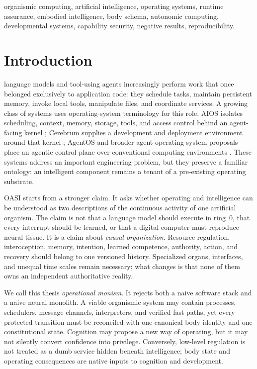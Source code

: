 \documentclass[journal,10pt]{IEEEtran}
\newcommand{\OASI}{\textsc{OASI}}
\begin{document}
\begin{IEEEkeywords}
organismic computing, artificial intelligence, operating systems, runtime assurance, embodied intelligence, body schema, autonomic computing, developmental systems, capability security, negative results, reproducibility.
\end{IEEEkeywords}

\section{Introduction}
 language models and tool-using agents increasingly perform work that once belonged exclusively to application code: they schedule tasks, maintain persistent memory, invoke local tools, manipulate files, and coordinate services. A growing class of systems uses operating-system terminology for this role. AIOS isolates scheduling, context, memory, storage, tools, and access control behind an agent-facing kernel \cite{mei2024aios}; Cerebrum supplies a development and deployment environment around that kernel \cite{rama2025cerebrum}; AgentOS and broader agent operating-system proposals place an agentic control plane over conventional computing environments \cite{liu2026agentos,sharma2026aos}. These systems address an important engineering problem, but they preserve a familiar ontology: an intelligent component remains a tenant of a pre-existing operating substrate.

\OASI{} starts from a stronger claim. It asks whether operating and intelligence can be understood as two descriptions of the continuous activity of one artificial organism. The claim is not that a language model should execute in ring~0, that every interrupt should be learned, or that a digital computer must reproduce neural tissue. It is a claim about \emph{causal organization}. Resource regulation, interoception, memory, intention, learned competence, authority, action, and recovery should belong to one versioned history. Specialized organs, interfaces, and unequal time scales remain necessary; what changes is that none of them owns an independent authoritative reality.

We call this thesis \emph{operational monism}. It rejects both a naive software stack and a naive neural monolith. A viable organismic system may contain processes, schedulers, message channels, interpreters, and verified fast paths, yet every protected transition must be reconciled with one canonical body identity and one constitutional state. Cognition may propose a new way of operating, but it may not silently convert confidence into privilege. Conversely, low-level regulation is not treated as a dumb service hidden beneath intelligence; body state and operating consequences are native inputs to cognition and development.
\end{document}
